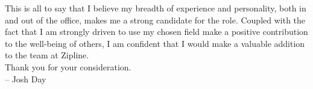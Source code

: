 \documentclass{muratcan_coverletter}
\begin{document}
{This is all to say that I believe my breadth of experience and personality, both in and out of the office, makes me a strong candidate for the role.
Coupled with the fact that I am strongly driven to use my chosen field make a positive contribution to the well-being of others, I am confident that I would make a valuable addition to the team at Zipline.
\\

Thank you for your consideration.
\\

-- Josh Day
}
\createfootnote
\end{document}
